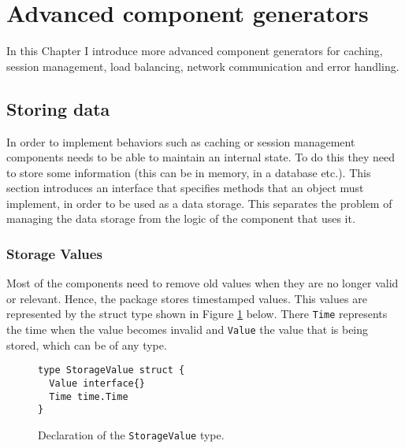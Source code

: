 \section{Advanced component generators}
\label{sec:impl2}
In this Chapter I introduce more advanced component generators for caching,
session management, load balancing, network communication and error handling.

\subsection{Storing data}
In order to implement behaviors such as caching or session management
components needs to be able to maintain an internal state.
To do this they need to store some information (this can be in memory, 
in a database etc.).
This section introduces an interface that specifies methods that an 
object must implement, in order to be used as a data storage. This 
separates the problem of managing the data storage from the logic of
the component that uses it.

\subsubsection{Storage Values}
Most of the components need to remove old values when they are no longer
valid or relevant. Hence, the package stores timestamped values. 
This values are represented by the struct type shown in Figure 
\ref{fig:StorageValue} below. There \texttt{Time} represents the time 
when the value becomes invalid and \texttt{Value} the value that is being
stored, which can be of any type.
\begin{figure}[h]
\centering
\begin{lstlisting}
type StorageValue struct {
  Value interface{}
  Time time.Time
}
\end{lstlisting}
\caption[scale=1.0]{Declaration of the \texttt{StorageValue} type.}
\label{fig:StorageValue}
\end{figure}


